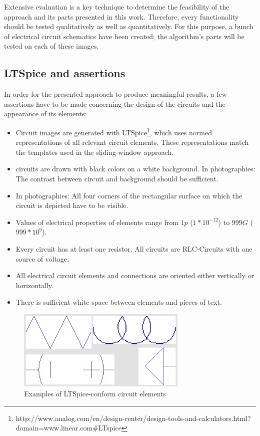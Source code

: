 \documentclass[10pt,twocolumn,letterpaper]{article}
\begin{document}
Extensive evaluation is a key technique to determine the feasibility of the approach and its parts presented in this work. Therefore, every functionality should be tested qualitatively as well as quantitatively. For this purpose, a bunch of electrical circuit schematics have been created; the algorithm's parts will be tested on each of these images. 
\par

\subsection{LTSpice and assertions}
\label{subsec:spice}

In order for the presented approach to produce meaningful results, a few assertions have to be made concerning the design of the circuits and the appearance of its elements:

\begin{itemize}
	\item Circuit images are generated with LTSpice\footnote[1]{http://www.analog.com/en/design-center/design-tools-and-calculators.html?domain=www.linear.com\#LTspice}, which uses normed representations of all relevant circuit elements. These representations match the templates used in the sliding-window approach.
	\item circuits are drawn with black colors on a white background. In photographies: The contrast between circuit and background should be sufficient.
	\item In photographies: All four corners of the rectangular surface on which the circuit is depicted have to be visible.
	\item Values of electrical properties of elements range from $1p$ ($1 * 10^{-12}$) to $999G$ ($999* 10^{9}$).
	\item Every circuit has at least one resistor. All circuits are RLC-Circuits with one source of voltage.
	\item All electrical circuit elements and connections are oriented either vertically or horizontally.
	\item There is sufficient white space between elements and pieces of text.
\end{itemize}
\par

\begin{figure}[!ht]
\includegraphics[width = 3.2in]{img/elements.png}
\caption{Examples of LTSpice-conform circuit elements}
\label{fig:c4}
\end{figure}
\end{document}
